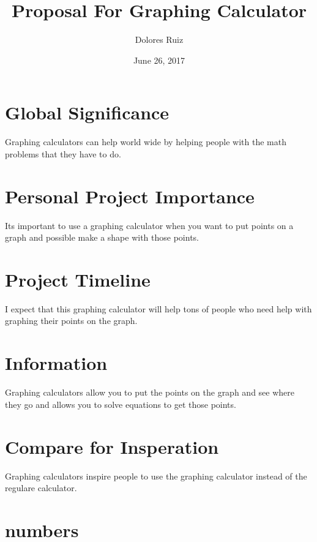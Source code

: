 \documentclass{article}
\title{Proposal For Graphing Calculator}
\author{Dolores Ruiz}
\date{June 26, 2017}
\begin{document}
	\maketitle
	\tableofcontents
	\section*{Global Significance}
		\hspace*{.5 in}Graphing calculators can help world wide by helping people with the math problems that they have to do.\\	
	\section*{Personal Project Importance}
		\hspace*{.5 in}Its important to use a graphing calculator when you want to put points on a graph and possible make a shape with those points.\\
	\section*{Project Timeline}
		\hspace{.5 in}I expect that this graphing calculator will help tons of people who need help with graphing their points on the graph.\\
	\section*{Information}
		\hspace*{.5 in}Graphing  calculators allow you to put the points on the graph and see where they go and allows you to solve equations to get those points.\\
	\section*{Compare for Insperation}
		\hspace*{.5 in}Graphing calculators inspire people to use the graphing calculator instead of the regulare calculator.\\
	\section*{numbers}
	
\end{document}
